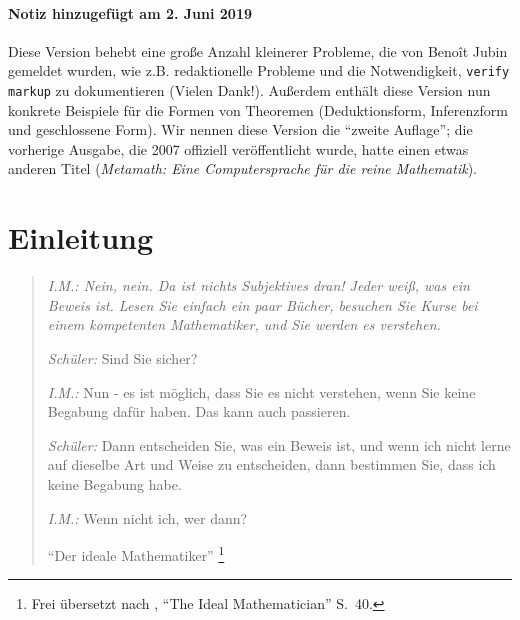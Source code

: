 \subsubsection{Notiz hinzugefügt am 2. Juni 2019}\label{note201906}

Diese Version behebt eine große Anzahl kleinerer Probleme, die von Beno\^{i}t Jubin gemeldet wurden, wie z.B. redaktionelle Probleme und die Notwendigkeit, \texttt{verify markup} zu dokumentieren (Vielen Dank!).
Außerdem enthält diese Version nun konkrete Beispiele für die Formen von Theoremen (Deduktionsform, Inferenzform und geschlossene Form).
Wir nennen diese Version die "`zweite Auflage"'; die vorherige Ausgabe, die 2007 offiziell veröffentlicht wurde, hatte einen etwas anderen Titel (\textit{Metamath: Eine Computersprache für die reine Mathematik}).


\chapter{Einleitung}

\begin{quotation}

  {\em {\em I.M.:}  Nein, nein.  Da ist nichts Subjektives dran!  Jeder weiß, was ein Beweis ist.  Lesen Sie einfach ein paar Bücher, besuchen Sie Kurse bei einem kompetenten Mathematiker, und Sie werden es verstehen.     
  
  {\em Schüler:}  Sind Sie sicher?
  
  {\em I.M.:}  Nun - es ist möglich, dass Sie es nicht verstehen, wenn Sie keine Begabung dafür haben.  Das kann auch passieren.
  
  {\em Schüler:}  Dann entscheiden Sie, was ein Beweis ist, und wenn ich nicht lerne auf dieselbe Art und Weise zu entscheiden, dann bestimmen Sie, dass ich keine Begabung habe.
  
  {\em I.M.:}  Wenn nicht ich, wer dann?}       
  
      \flushright\sc "`Der ideale Mathematiker"'
      \footnote{Frei übersetzt nach \cite{Davis}, \sc  "`The Ideal Mathematician"' S.~40.}\\
\end{quotation}

